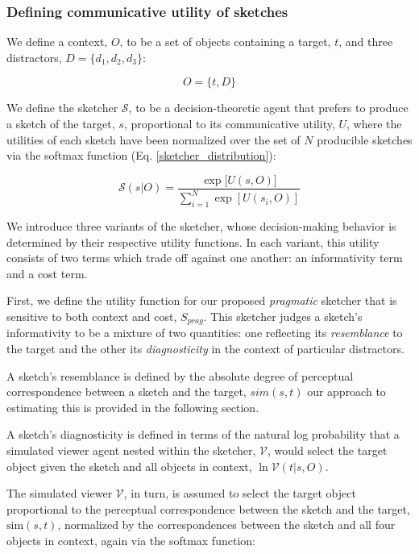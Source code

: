 \documentclass[9pt,twocolumn,twoside]{pnas-new}
\begin{document}
\subsubsection*{Defining communicative utility of sketches}

We define a context, $O$, to be a set of objects containing a target, $t$, and three distractors, $D=\{d_1,d_2,d_3\}$:

\begin{equation} \label{object set}
O = \{t,D\}
\end{equation}

We define the sketcher $\mathcal{S}$, to be a decision-theoretic agent that prefers to produce a sketch of the target, $s$, proportional to its communicative utility, $U$, where the utilities of each sketch have been normalized over the set of $N$ producible sketches via the softmax function (Eq. \ref{sketcher_distribution}):

\begin{equation} \label{sketcher_distribution}
\mathcal{S}(s|O) = \frac {\exp [{U(s,O)]}} {\sum_{i=1}^{N} {\exp [U(s_i,O)]}}
\end{equation}

We introduce three variants of the sketcher, whose decision-making behavior is determined by their respective utility functions. 
In each variant, this utility consists of two terms which trade off against one another: an informativity term and a cost term. 

First, we define the utility function for our proposed \textit{pragmatic} sketcher that is sensitive to both context and cost, $S_{prag}$. 
This sketcher judges a sketch's informativity to be a mixture of two quantities: one reflecting its \textit{resemblance} to the target and the other its \textit{diagnosticity} in the context of particular distractors. 

A sketch's resemblance is defined by the absolute degree of perceptual correspondence between a sketch and the target, $sim(s,t)$ our approach to estimating this is provided in the following section. 

A sketch's diagnosticity is defined in terms of the natural log probability that a simulated viewer agent nested within the sketcher, $\mathcal{V}$, would select the target object given the sketch and all objects in context, $\ln \mathcal{V}(t|s,O)$. 

The simulated viewer $\mathcal{V}$, in turn, is assumed to select the target object proportional to the perceptual correspondence between the sketch and the target, $\textrm{sim}(s,t)$, normalized by the correspondences between the sketch and all four objects in context, again via the softmax function:
\end{document}
